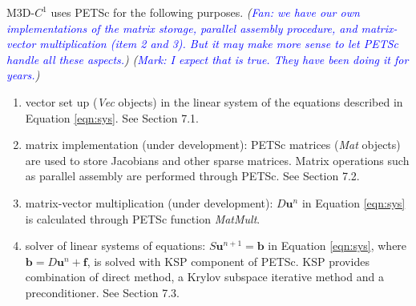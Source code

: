 \documentclass[11pt]{article}  %
\begin{document}

M3D-$C^1$ uses PETSc for the following purposes. 
\textit{(\textcolor{blue}{Fan: we have our own implementations of the matrix storage, parallel assembly procedure, and matrix-vector multiplication (item 2 and 3). But it may make more sense to let PETSc handle all these aspects.})} \textit{(\textcolor{blue}{Mark: I expect that is true. They have been doing it for years.})}
\begin{enumerate}
\item vector set up (\emph{Vec} objects)  in the linear system of the equations described in Equation \ref{eqn:sys}. See Section 7.1. %
\item matrix implementation (under development): PETSc matrices (\emph{Mat} objects) are used to store Jacobians and other sparse matrices. Matrix operations such as parallel assembly are performed through PETSc. See Section 7.2.
\item matrix-vector multiplication (under development): $D\mathbf{u}^n$ in Equation \ref{eqn:sys}  is calculated through PETSc function \emph{MatMult}.
\item solver of linear systems of equations: $S \mathbf{u}^{n+1} = \mathbf{b}$  in Equation \ref{eqn:sys}, where $\mathbf{b} = D \mathbf{u}^n +\mathbf{f}$, is solved with KSP component of PETSc. KSP provides combination of direct method, a Krylov subspace iterative method and a preconditioner. See Section 7.3.
\end{enumerate}

%
\end{document}

